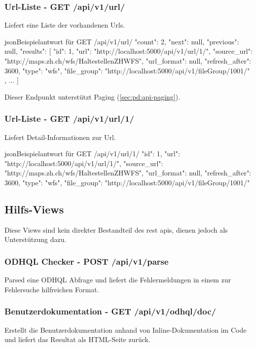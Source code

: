 \subsubsection{Url-Liste - GET /api/v1/url/}
Liefert eine Liste der vorhandenen Urls.

\begin{srclst}{json}{Beispielantwort für GET /api/v1/url/}
{
    "count": 2, 
    "next": null, 
    "previous": null, 
    "results": [
        {
            "id": 1, 
            "url": "http://localhost:5000/api/v1/url/1/", 
            "source_url": "http://maps.zh.ch/wfs/HaltestellenZHWFS", 
            "url_format": null, 
            "refresh_after": 3600, 
            "type": "wfs", 
            "file_group": "http://localhost:5000/api/v1/fileGroup/1001/"
        }, 
        ...
    ]
}
\end{srclst}

Dieser Endpunkt unterstützt Paging (\cref{sec:pd:api-paging}).

\subsubsection{Url-Liste - GET /api/v1/url/1/}
Liefert Detail-Informationen zur Url.

\begin{srclst}{json}{Beispielantwort für GET /api/v1/url/1/}
{
    "id": 1, 
    "url": "http://localhost:5000/api/v1/url/1/", 
    "source_url": "http://maps.zh.ch/wfs/HaltestellenZHWFS", 
    "url_format": null, 
    "refresh_after": 3600, 
    "type": "wfs", 
    "file_group": "http://localhost:5000/api/v1/fileGroup/1001/"
}
\end{srclst}

\subsection{Hilfs-Views}
Diese Views sind kein direkter Bestandteil des \gls{rest} \acs{api}s, dienen jedoch als Unterstützung dazu.

\subsubsection{ODHQL Checker - POST /api/v1/parse} \label{sec:pd:api-parse}
Parsed eine ODHQL Abfrage und liefert die Fehlermeldungen in einem zur Fehlersuche hilfreichen Format.

\subsubsection{Benutzerdokumentation - GET /api/v1/odhql/doc/}
Erstellt die Benutzerdokumentation anhand von Inline-Dokumentation im Code und liefert das Resultat als HTML-Seite zurück.